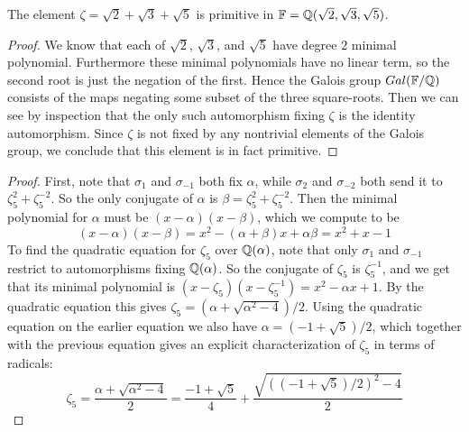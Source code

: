 \documentclass[11pt]{article}
\begin{document}
The element $\zeta = \sqrt 2 + \sqrt 3 + \sqrt 5$ is primitive in $\mathbb{F} = \mathbb{Q}(\sqrt 2, \sqrt 3, \sqrt 5)$.
\begin{proof}
  We know that each of $\sqrt 2$, $\sqrt 3$, and $\sqrt 5$ have degree $2$ minimal polynomial.
  Furthermore these minimal polynomials have no linear term, so the second root is just the negation of the first.
  Hence the Galois group $Gal(\mathbb{F}/\mathbb{Q})$ consists of the maps negating some subset of the three square-roots.
  Then we can see by inspection that the only such automorphism fixing $\zeta$ is the identity automorphism.
  Since $\zeta$ is not fixed by any nontrivial elements of the Galois group, we conclude that this element is in fact primitive.
\end{proof}


\begin{proof}
  First, note that $\sigma_{1}$ and $\sigma_{-1}$ both fix $\alpha$, while $\sigma_{2}$ and $\sigma_{-2}$ both send it to $\zeta_5^2+\zeta_5^{-2}$.
  So the only conjugate of $\alpha$ is $\beta = \zeta_5^2+\zeta_5^{-2}$.
  Then the minimal polynomial for $\alpha$ must be $(x-\alpha)(x-\beta)$, which we compute to be
  \begin{equation*}
    (x-\alpha)(x-\beta)
    = x^2 - (\alpha + \beta)x + \alpha\beta
    = x^2 + x - 1
  \end{equation*}
  To find the quadratic equation for $\zeta_5$ over $\mathbb{Q}(\alpha)$, note that only $\sigma_1$ and $\sigma_{-1}$ restrict to automorphisms fixing $\mathbb{Q}(\alpha)$.
  So the conjugate of $\zeta_5$ is $\zeta_{5}^{-1}$, and we get that its minimal polynomial is $(x-\zeta_5)(x-\zeta_5^{-1}) = x^2 - \alpha x + 1$.
  By the quadratic equation this gives $\zeta_5 = (\alpha + \sqrt{\alpha^2 - 4})/2$.
  Using the quadratic equation on the earlier equation we also have $\alpha = (-1 + \sqrt{5})/2$, which together with the previous equation gives an explicit characterization of $\zeta_5$ in terms of radicals:
  \begin{equation*}
    \zeta_5
    = \frac{\alpha + \sqrt{\alpha^2 - 4}}{2}
    = \frac{-1 + \sqrt{5}}{4} + \frac{\sqrt{((-1 + \sqrt{5})/2)^2 - 4}}{2}
  \end{equation*}
\end{proof}
\end{document}
